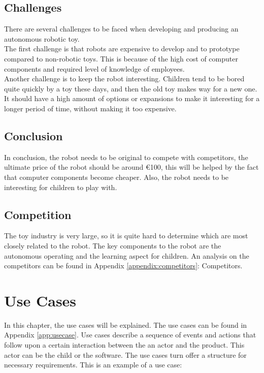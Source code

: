 \documentclass[11pt,twoside,a4paper]{report}
\begin{document}
\section{Challenges}
There are several challenges to be faced when developing and producing an autonomous robotic toy. \\
The first challenge is that robots are expensive to develop and to prototype compared to non-robotic toys. This is because of the high cost of computer components and required level of knowledge of employees.\\
Another challenge is to keep the robot interesting. Children tend to be bored quite quickly by a toy these days, and then the old toy makes way for a new one. It should have a high amount of options or expansions to make it interesting for a longer period of time, without making it too expensive. \\

\section{Conclusion}
In conclusion, the robot needs to be original to compete with competitors, the ultimate price of the robot should be around €100, this will be helped by the fact that computer components become cheaper. Also, the robot needs to be interesting for children to play with.     

\section{Competition}
The toy industry is very large, so it is quite hard to determine which are most closely related to the robot. The key components to the robot are the autonomous operating and the learning aspect for children. An analysis on the competitors can be found in Appendix \ref{appendix:competitors}: Competitors.

\chapter{Use Cases}
In this chapter, the use cases will be explained. The use cases can be found in Appendix \ref{app:usecase}. 
Use cases describe a sequence of events and actions that follow upon a certain interaction between the an actor and the product. This actor can be the child or the software. The use cases turn offer a structure for necessary requirements.
This is an example of a use case:
\end{document}
